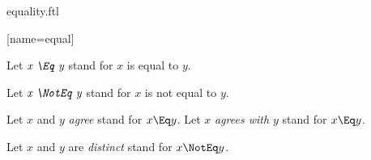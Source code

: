\documentclass{stex}
\begin{document}
\begin{smodule}{equality.ftl}

[name=equal]{\mathrel{\comp=}}

\begin{fakeforthel}
  \begin{convention}[for=Eq]
    Let $\emph{x \Eq y}$ stand for $x$ is equal to $y$.
  \end{convention}
\end{fakeforthel}

\begin{fakeforthel}
  \begin{convention}[for=NotEq]
    Let $\emph{x \NotEq y}$ stand for $x$ is not equal to $y$.
  \end{convention}
\end{fakeforthel}

\begin{forthel}
  \begin{convention}[for=agree]
    Let $x$ and $y$ \emph{agree} stand for $x \Eq y$.
    Let $x$ \emph{agrees with $y$} stand for $x \Eq y$.
  \end{convention}
\end{forthel}

\begin{forthel}
  \begin{convention}[for=distinct]
    Let $x$ and $y$ are \emph{distinct} stand for $x \NotEq y$.
  \end{convention}
\end{forthel}

\end{smodule}
\end{document}
